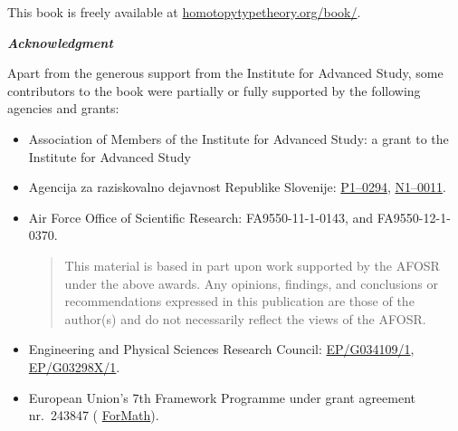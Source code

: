 {\bigskip

\noindent
This book is freely available at \href{http://homotopytypetheory.org/book/}{homotopytypetheory.org/book/}.

\bigskip

\noindent
\emph{\textbf{\small Acknowledgment}}

\medskip

\noindent
Apart from the generous support from the Institute for Advanced Study, some contributors
to the book were partially or fully supported by the following agencies and grants:
%
\begin{itemize}
\item Association of Members of the Institute for Advanced Study: a grant to the Institute for Advanced Study %
\item Agencija za raziskovalno dejavnost Republike Slovenije:  %
\href{http://www.sicris.si/search/prg.aspx?id=6120}{P1--0294},
\href{http://www.sicris.si/search/prj.aspx?id=7109}{N1--0011}.

\item Air Force Office of Scientific Research:
  FA9550-11-1-0143, and %
  FA9550-12-1-0370.  %
  {
    \setlength{\parskip}{0pt}
    \begin{quote}
      \noindent\scriptsize
      This material is based in part upon work supported by the AFOSR under the above awards.
      Any opinions, findings, and conclusions or recommendations expressed in this publication are those of the author(s) and do not necessarily reflect the views of the AFOSR.
    \end{quote}
  }

\item Engineering and Physical Sciences Research Council: %
   \href{http://gow.epsrc.ac.uk/NGBOViewGrant.aspx?GrantRef=EP/G034109/1}{EP/G034109/1}, %
   \href{http://gow.epsrc.ac.uk/NGBOViewGrant.aspx?GrantRef=EP/G03298X/1}{EP/G03298X/1}. %

\item European Union's 7th Framework Programme under grant agreement nr.\ 243847 (%
\href{http://wiki.portal.chalmers.se/cse/pmwiki.php/ForMath/ForMath/}{ForMath}). %


\end{itemize}}
